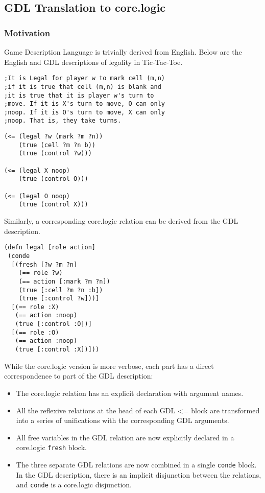 \documentclass[letterpaper]{article}
\begin{document}
\subsection{GDL Translation to core.logic}
\subsubsection{Motivation}
Game Description Language is trivially derived from English. Below are the English and GDL descriptions of legality in Tic-Tac-Toe.
\begin{lstlisting}[frame=single, caption=The Legal relation for Tic-Tac-Toe expressed in English]
;It is Legal for player w to mark cell (m,n)
;if it is true that cell (m,n) is blank and
;it is true that it is player w's turn to
;move. If it is X's turn to move, O can only
;noop. If it is O's turn to move, X can only
;noop. That is, they take turns. 
\end{lstlisting}
\begin{lstlisting}[frame=single, caption=The Legal relation for Tic-Tac-Toe expressed in GDL]
(<= (legal ?w (mark ?m ?n))
    (true (cell ?m ?n b))
    (true (control ?w)))

(<= (legal X noop)
    (true (control O)))

(<= (legal O noop)
    (true (control X)))
\end{lstlisting}

Similarly, a corresponding core.logic relation can be derived from the GDL description.

\begin{lstlisting}[frame=single, caption=The Legal relation translated into core.logic]
(defn legal [role action]
 (conde
  [(fresh [?w ?m ?n]
    (== role ?w)
    (== action [:mark ?m ?n])
    (true [:cell ?m ?n :b])
    (true [:control ?w]))]
  [(== role :X)
   (== action :noop)
   (true [:control :O])]
  [(== role :O)
   (== action :noop)
   (true [:control :X])]))
\end{lstlisting}

While the core.logic version is more verbose, each part has a direct correspondence to part of the GDL description:
\begin{itemize}
\item The core.logic relation has an explicit declaration with argument names.
\item All the reflexive relations at the head of each GDL \textless= block are transformed into a series of unifications with the corresponding GDL arguments. 
\item All free variables in the GDL relation are now explicitly declared in a core.logic \texttt{fresh} block.
\item The three separate GDL relations are now combined in a single \texttt{conde} block. In the GDL description, there is an implicit disjunction between the relations, and \texttt{conde} is a core.logic disjunction.
\end{itemize}
\end{document}
